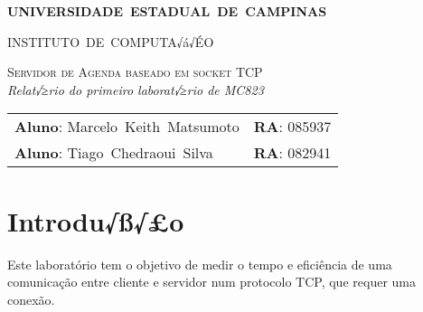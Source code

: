\documentclass[10pt,a4paper]{article}
\begin{document}
\begin{titlepage}
  \thispagestyle{empty}
  \begin{center} {\large \textbf{UNIVERSIDADE~ESTADUAL~DE~CAMPINAS}} \end{center}
  \begin{center} {\large INSTITUTO~DE~COMPUTA√á√ÉO}                    \end{center}
  \vspace{0.1cm}
  \begin{center}
    \begin{minipage}[tl]{31mm}
    \end{minipage}
  \end{center}
  \vspace{0.3cm}
  \begin{center} 
    {\large \textsc{Servidor de Agenda baseado em socket TCP
      }} 
    \\\vspace{0.5cm}
    {\textsl{Relat√≥rio do primeiro laborat√≥rio de MC823}}
    \\\vspace{1cm}
    \begin{tabular}{ll}
      \textbf{Aluno}:        Marcelo~Keith~Matsumoto   &  \textbf{RA}:       085937 \\
      \textbf{Aluno}:        Tiago~Chedraoui~Silva    &   \textbf{RA}:       082941 \\
   
    \end{tabular}
  \end{center}
  \vspace{0.5cm}

  \begin{abstract}

  \end{abstract}

  \tableofcontents
\end{titlepage} 



\section{Introdu√ß√£o}
	Este laboratório tem o objetivo de medir o tempo e eficiência de uma comunicação entre cliente e servidor num protocolo TCP, que requer uma conexão.
\end{document}
